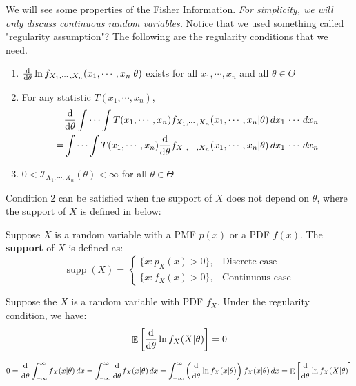 \documentclass{huhtakm-template-book-v2}
\DeclareMathOperator{\E}{\mathbb{E}}
\DeclareMathOperator{\supp}{supp}
\begin{document}
\newpage
We will see some properties of the Fisher Information. \textit{For simplicity, we will only discuss continuous random variables.} Notice that we used something called "regularity assumption"? The following are the regularity conditions that we need.
\begin{enumerate}
	\item $\odv*{}{\theta}\ln{f_{X_{1},\cdots,X_{n}}}(x_{1},\cdots,x_{n}|\theta)$ exists for all $x_{1},\cdots,x_{n}$ and all $\theta\in\Theta$
	\item For any statistic $T(x_{1},\cdots,x_{n})$,
	\begin{align*}
		&\odv*{}{\theta}\int\cdots\int T(x_{1},\cdots,x_{n})f_{X_{1},\cdots,X_{n}}(x_{1},\cdots,x_{n}|\theta)\,dx_{1}\,\cdots\,dx_{n}\\
		=&\int\cdots\int T(x_{1},\cdots,x_{n})\odv*{}{\theta}f_{X_{1},\cdots,X_{n}}(x_{1},\cdots,x_{n}|\theta)\,dx_{1}\,\cdots\,dx_{n}
	\end{align*}
	\item $0<\mathcal{I}_{X_{1},\cdots,X_{n}}(\theta)<\infty$ for all $\theta\in\Theta$
\end{enumerate}
Condition 2 can be satisfied when the support of $X$ does not depend on $\theta$, where the support of $X$ is defined in below:
\begin{defn}
	Suppose $X$ is a random variable with a PMF $p(x)$ or a PDF $f(x)$. The \textbf{support} of $X$ is defined as:
	\begin{equation*}
		\supp(X)=\begin{cases}
			\{x:p_{X}(x)>0\}, &\text{Discrete case}\\
			\{x:f_{X}(x)>0\}, &\text{Continuous case}
		\end{cases}
	\end{equation*}
\end{defn}
\begin{lem}
	\label{Chapter 2 (Lemma) Expectation of Fisher Information but with first moment is zero}
	Suppose the $X$ is a random variable with PDF $f_{X}$. Under the regularity condition, we have:
	\begin{equation*}
		\E\left[\odv*{}{\theta}\ln{f_{X}(X|\theta)}\right]=0
	\end{equation*}
\end{lem}
\begin{proofing}
	\begin{equation*}
		0=\odv*{}{\theta}\intinfty f_{X}(x|\theta)\,dx=\intinfty\odv*{}{\theta}f_{X}(x|\theta)\,dx=\intinfty\left(\odv*{}{\theta}\ln{f_{X}(x|\theta)}\right)f_{X}(x|\theta)\,dx=\E\left[\odv*{}{\theta}\ln{f_{X}(X|\theta)}\right]
	\end{equation*}
\end{proofing}
\end{document}
